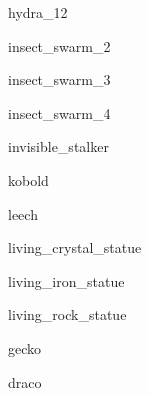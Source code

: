 \documentclass[a4paper,serif]{module}
\begin{document}
\begin{newmonster}{hydra_12}\end{newmonster}


\begin{newmonster}{insect_swarm_2}\end{newmonster}

\begin{newmonster}{insect_swarm_3}\end{newmonster}

\begin{newmonster}{insect_swarm_4}\end{newmonster}

\begin{newmonster}{invisible_stalker}\end{newmonster}

\begin{newmonster}{kobold}\end{newmonster}

\begin{newmonster}{leech}\end{newmonster}


\begin{newmonster}{living_crystal_statue}\end{newmonster}

\begin{newmonster}{living_iron_statue}\end{newmonster}

\begin{newmonster}{living_rock_statue}\end{newmonster}


\begin{newmonster}{gecko}\end{newmonster}

\begin{newmonster}{draco}\end{newmonster}
\end{document}
